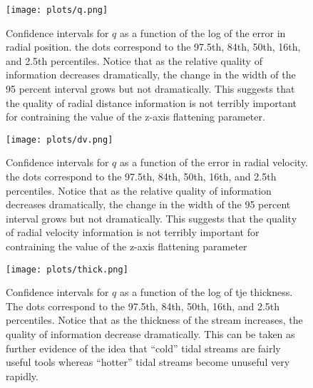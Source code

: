 \documentclass[12pt,preprint]{aastex}
\theoremstyle{plain}
\theoremstyle{definition}
\begin{document}
\begin{figure}[ht]
\begin{center}
\texttt{[image: plots/q.png]}
\caption{Confidence intervals for $q$ as a function of the log of the error in radial position. the dots correspond to the 97.5th, 84th, 50th, 16th, and 2.5th percentiles. Notice that as the relative quality of information decreases dramatically, the change in the width of the 95 percent interval grows but not dramatically. This suggests that the quality of radial distance information is not terribly important for contraining the value of the z-axis flattening parameter. }
\label{fig:radposerr}
\end{center}
\end{figure}

\begin{figure}[ht]
\begin{center}
\texttt{[image: plots/dv.png]}
\caption{Confidence intervals for $q$ as a function of the error in radial velocity. the dots correspond to the 97.5th, 84th, 50th, 16th, and 2.5th percentiles. Notice that as the relative quality of information decreases dramatically, the change in the width of the 95 percent interval grows but not dramatically. This suggests that the quality of radial velocity information is not terribly important for contraining the value of the z-axis flattening parameter}
\label{fig:radvelerr}
\end{center}
\end{figure}

\begin{figure}[ht]
\begin{center}
\texttt{[image: plots/thick.png]}
\caption{Confidence intervals for $q$ as a function of the log of tje thickness. The dots correspond to the 97.5th, 84th, 50th, 16th, and 2.5th percentiles. Notice that as the thickness of the stream increases, the quality of information decrease dramatically. This can be taken as further evidence of the idea that ``cold'' tidal streams are fairly useful tools whereas ``hotter'' tidal streams become unuseful very rapidly.} 
\label{fig:thick}
\end{center}
\end{figure}
\end{document}
